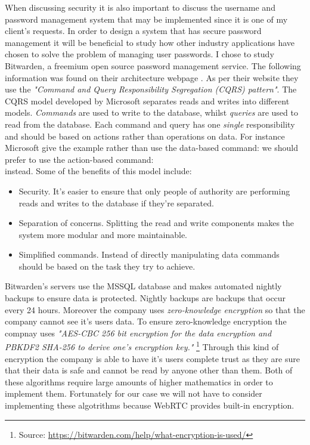 When discussing security it is also important to discuss the 
username and password management system that may be implemented
since it is one of my client's requests. In order to design a 
system that has secure password management it will be 
beneficial to study how other industry applications have chosen
to solve the problem of managing user passwords. I chose to 
study Bitwarden, a freemium open source password management 
service. The following information was found on their 
architecture webpage \cite{Bitwarden}. As per their website 
they use the \textit{"Command and Query Responsibility 
Segregation (CQRS) pattern"}. The CQRS model developed by 
Microsoft separates reads and writes into different models. 
\textit{Commands} are used to write to the database, whilst 
\textit{queries} are used to read from the database. Each 
command and query has one \emph{single} responsibility and 
should be based on actions rather than operations on data. For
instance Microsoft give the example rather than use the
data-based command: 
we should prefer to use the action-based command: \\
 instead. Some of the benefits of 
this model include: 

\begin{itemize}
  \item Security. It's easier to ensure that only people of authority are performing reads and writes to the database if 
they're separated.

  \item Separation of concerns. Splitting the read and write components makes the system more modular and more maintainable. 

  \item Simplified commands. Instead of directly manipulating data commands should be based on the task they try to 
achieve.
\end{itemize}

Bitwarden's servers use the MSSQL database and makes automated
nightly backups to ensure data is protected. Nightly backups 
are backups that occur every 24 hours. Moreover the 
company uses \textit{zero-knowledge encryption} so that the 
company cannot see it's users data. To ensure zero-knowledge 
encryption the compnay uses \textit{"AES-CBC 256 bit 
encryption for the data encryption and PBKDF2 SHA-256 to 
derive one's encryption key."} \footnote{Source: 
\url{https://bitwarden.com/help/what-encryption-is-used/}} 
Through this kind of encryption the company is able to have
it's users complete trust as they are sure that their data is 
safe and cannot be read by anyone other than them. Both of 
these algorithms require large amounts of higher mathematics
in order to implement them. Fortunately
for our case we will not have to consider implementing these
algotrithms because WebRTC provides built-in encryption. \\
\vspace{0.2cm}

